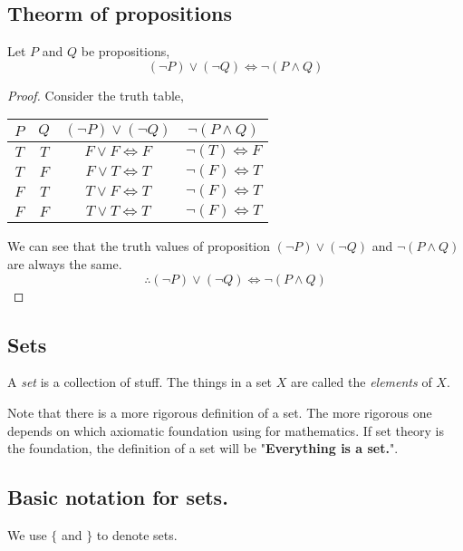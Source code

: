 \documentclass[a4paper]{article}
\begin{document}
\subsection{Theorm of propositions}
\begin{thm}
Let $P$ and $Q$ be propositions,
$$(\lnot P) \lor (\lnot Q) \iff \lnot(P \land Q)$$
\end{thm}
\begin{proof}
Consider the truth table,
\begin{center}
	\begin{tabular}{|c|c|c|c|}
		\hline
		$P$ & $Q$ & $(\lnot P) \lor (\lnot Q)$ & $\lnot(P \land Q)$\\
		\hline
		$T$ & $T$ & $F \lor F \iff F$ & $\lnot(T) \iff F$\\
		\hline
		$T$ & $F$ & $F \lor T \iff T$ & $\lnot(F) \iff T$\\
		\hline
		$F$ & $T$ & $T \lor F \iff T$ & $\lnot(F) \iff T$\\
		\hline
		$F$ & $F$ & $T \lor T \iff T$ & $\lnot(F) \iff T$\\
		\hline
	\end{tabular}
\end{center}
We can see that the truth values of proposition $(\lnot P) \lor (\lnot Q)$ and $\lnot(P \land Q)$ are always the same.
$$\therefore (\lnot P) \lor (\lnot Q) \iff \lnot(P \land Q)$$
\end{proof}

\subsection{Sets}
\begin{defi}[Set]
	A \emph{set} is a collection of stuff. The things in a set $X$ are called the \emph{elements} of $X$.
\end{defi}
Note that there is a more rigorous definition of a set. The more rigorous one depends on which axiomatic foundation using for mathematics. If set theory is the foundation, the definition of a set will be "\textbf{Everything is a set.}".

\subsection{Basic notation for sets.}

\begin{notation}
We use $\{$ and $\}$ to denote sets.
\end{notation}
\end{document}
